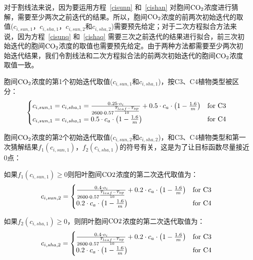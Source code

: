 对于割线法来说，因为要运用方程~\eqref{cisunn} 和~\eqref{cishan} 对胞间$\rm CO_2$浓度进行猜解，需要至少两次之前迭代的结果。所以，胞间$\rm CO_2$浓度的前两次初始迭代的取值($c_{i,sun,1}$，$c_{i,sha,1}$，$c_{i,sun,2}$和$c_{i,sha,2}$)需要预先给定；对于二次方程拟合方法来说，因为方程~\eqref{cisunq} 和~\eqref{cishaq} 需要三次之前迭代的结果进行拟合，前三次初始迭代的胞间$\rm CO_2$浓度的取值也需要预先给定。由于两种方法都需要至少两次初始迭代结果，我们令割线法和二次方程拟合法的前两次初始迭代的胞间$\rm CO_2$浓度取值一致。

胞间$\rm CO_2$浓度的第1个初始迭代取值($c_{i,sun,1}$和$c_{i,sha,1}$)，按C3、C4植物类型被区分：
\begin{align}\label{ci_1}
\begin{cases}
c_{i,sun,1}=c_{i,sha,1}=\frac{0.25 \cdot o_{i}} {2600 \cdot 0.57 ^\frac{T_{{leaf }} -  T_{o p}}{10}} + 0.5\cdot c_{a}\cdot\left(1-\frac{1.6}{m}\right) &\rm for\,\, C3\\
c_{i,sun,1}=c_{i,sha,1}=0.5\cdot c_{a}\cdot\left(1-\frac{1.6}{m}\right)   &\rm for\,\, C4
\end{cases}
\end{align}

胞间$\rm CO_2$浓度的第2个初始迭代取值($c_{i,sun,2}$和$c_{i,sha,2}$)，和C3、C4植物类型和第一次猜解结果$f_{1}\left(c_{i,sun,1}\right)$，$f_{2}\left(c_{i,sha,1}\right)$的符号有关，这是为了让目标函数尽量接近0点：

如果$f_{1}\left(c_{i,sun,1}\right)\geqslant 0$则阳叶胞间$\rm CO2$浓度的第二次迭代取值为：
\begin{align}\label{cisun_2_fp}
c_{i,sun,2}=
\begin{cases}
\frac{0.4 \cdot o_{i}} {2600 \cdot 0.57 ^\frac{T_{{leaf }} -  T_{o p}}{10}} + 0.2\cdot c_{a}\cdot\left(1-\frac{1.6}{m}\right)  &\rm for\,\, C3\\
0.2\cdot c_{a}\cdot\left(1-\frac{1.6}{m}\right) &\rm for\,\, C4
\end{cases}
\end{align}

如果$f_{2}\left(c_{i,sha,1}\right)\geqslant0$，则阴叶胞间$\rm CO2$浓度的第二次迭代取值为：
\begin{align}\label{cisha_2_fp}
c_{i,sha,2}=
\begin{cases}
\frac{0.4 \cdot o_{i}} {2600 \cdot 0.57 ^\frac{T_{{leaf }} -  T_{o p}}{10}} + 0.2\cdot c_{a}\cdot\left(1-\frac{1.6}{m}\right)  &\rm for\,\, C3\\
0.2\cdot c_{a}\cdot\left(1-\frac{1.6}{m}\right) &\rm for\,\, C4
\end{cases}
\end{align}

